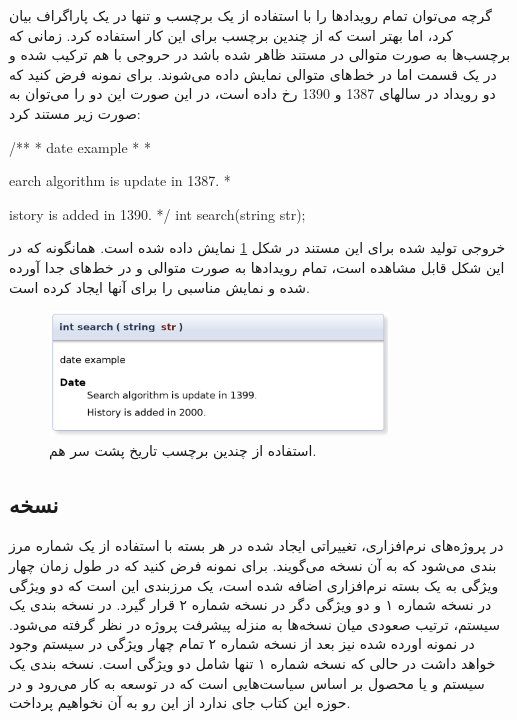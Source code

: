 گرچه می‌توان تمام رویدادها را با استفاده از یک برچسب و تنها در یک پاراگراف بیان
کرد، اما بهتر است که از چندین برچسب برای این کار استفاده کرد.
زمانی که برچسب‌ها به صورت متوالی در مستند ظاهر شده باشد در حروجی با هم ترکیب شده
و در یک قسمت اما در خط‌های متوالی نمایش داده می‌شوند.
برای نمونه فرض کنید که دو رویداد در سالهای 1387 و 1390 رخ داده است، در این صورت
این دو را می‌توان به صورت زیر مستند کرد:

\begin{C++}
/**
 * \brief date example
 *
 * \date Search algorithm is update in 1387.
 * \date History is added in 1390.
 */
int search(string str);
\end{C++}

خروجی تولید شده برای این مستند در شکل
\ref{write/document-the-code/developer-info/date-multi} نمایش داده شده است.
همانگونه که در این شکل قابل مشاهده است، تمام رویدادها به صورت متوالی و در خط‌های
جدا آورده شده و نمایش مناسبی را برای آنها ایجاد کرده است.
\begin{figure}
	\centering
	\includegraphics[width=0.8\textwidth]{image/write/document-the-code/developer-info/date-multi}
	\caption[چند برچسب تاریخ]{
		استفاده از چندین برچسب تاریخ پشت سر هم.
	}
	\label{write/document-the-code/developer-info/date-multi}
\end{figure}


\subsection{نسخه}

در پروژه‌های نرم‌افزاری، تغییراتی ایجاد شده در هر بسته با استفاده از یک شماره
مرز بندی می‌شود که به آن نسخه می‌گویند.
برای نمونه فرض کنید که در طول زمان چهار ویژگی به یک بسته نرم‌افزاری اضافه شده
است، یک مرزبندی این است که دو ویژگی در نسخه شماره ۱ و دو ویژگی دگر در نسخه شماره
۲ قرار گیرد.
در نسخه بندی یک سیستم، ترتیب صعودی میان نسخه‌ها به منزله پیشرفت پروژه در نظر
گرفته می‌شود.
در نمونه اورده شده نیز بعد از نسخه شماره ۲ تمام چهار ویژگی در سیستم وجود خواهد
داشت در حالی که نسخه شماره ۱ تنها شامل دو ویژگی است.
نسخه بندی یک سیستم و یا محصول بر اساس سیاست‌هایی است که در توسعه به کار می‌رود و
در حوزه این کتاب جای ندارد از این رو به آن نخواهیم پرداخت.

